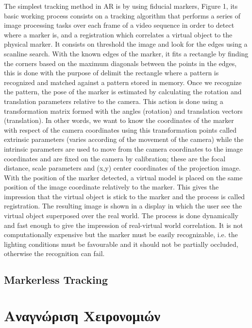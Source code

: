 The simplest tracking method in AR is by using fiducial markers, Figure 1, its basic working process consists on a tracking algorithm that performs a series of image processing tasks over each frame of a video sequence in order to detect where a marker is, and a registration which correlates a virtual object to the physical marker\cite{krevelen2010}. It consists on threshold the image and look for the edges using a scanline search. With the known edges of the marker, it fits a rectangle by finding the corners based on the maximum diagonals between the points in the edges, this is done with the purpose of delimit the rectangle where a pattern is recognized and matched against a pattern stored in memory. Once we recognize the pattern, the pose of the marker is estimated by calculating the rotation and translation parameters relative to the camera. This action is done using a transformation matrix formed with the angles (rotation) and translation vectors (translation). In other words, we want to know the coordinates of the marker with respect of the camera coordinates using this transformation points called extrinsic parameters (varies according of the movement of the camera) while the intrinsic parameters are used to move from the camera coordinates to the image coordinates and are fixed on the camera by calibration; these are the focal distance, scale parameters and (x,y) center coordinates of the projection image. With the position of the marker detected, a virtual model is placed on the same position of the image coordinate relatively to the marker. This gives the impression that the virtual object is stick to the marker and the process is called registration. The resulting image is shown in a display in which the user see the virtual object superposed over the real world. The process is done dynamically and fast enough to give the impression of real-virtual world correlation. It is not computationally expensive but the marker must be easily recognizable, i.e. the lighting conditions must be favourable and it should not be partially occluded, otherwise the recognition can fail.

    
\subsection{Markerless Tracking}



\section{Αναγνώριση Χειρονομιών}


